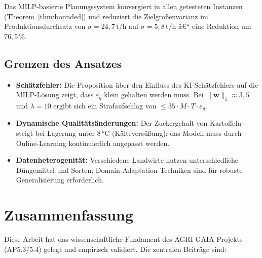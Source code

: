 ﻿\documentclass[12pt,a4paper]{article}
\theoremstyle{plain}
\theoremstyle{definition}
\begin{document}
	Das MILP-basierte Planungssystem konvergiert in allen getesteten Instanzen
	(Theorem~\ref{thm:bounded}) und reduziert die Zielgrößenvarianz im
	Produktionsdurchsatz von $\sigma = 24{,}7\,\text{t/h}$ auf
	$\sigma = 5{,}8\,\text{t/h}$ â€“ eine Reduktion um $76{,}5\,\%$.
	
	\subsection{Grenzen des Ansatzes}
	
	\begin{itemize}
		\item \textbf{Schätzfehler:} Die Proposition über den Einfluss des KI-Schätzfehlers
		auf die MILP-Lösung zeigt, dass $\varepsilon_q$ klein gehalten werden muss.
		Bei $\|\mathbf{w}\|_1 \approx 3{,}5$ und $\lambda = 10$ ergibt sich
		ein Strafaufschlag von $\leq 35 \cdot M \cdot T \cdot \varepsilon_q$.
		\item \textbf{Dynamische Qualitätsänderungen:} Der Zuckergehalt von
		Kartoffeln steigt bei Lagerung unter $8\, °\text{C}$ (Kälteversüßung);
		das Modell muss durch Online-Learning kontinuierlich angepasst werden.
		\item \textbf{Datenheterogenität:} Verschiedene Landwirte nutzen
		unterschiedliche Düngemittel und Sorten; Domain-Adaptation-Techniken
		sind für robuste Generalisierung erforderlich.
	\end{itemize}
	
	\section{Zusammenfassung}
	
	Diese Arbeit hat das wissenschaftliche Fundament des AGRI-GAIA-Projekts
	(AP5.3/5.4) gelegt und empirisch validiert. Die zentralen Beiträge sind:
	
\end{document}
